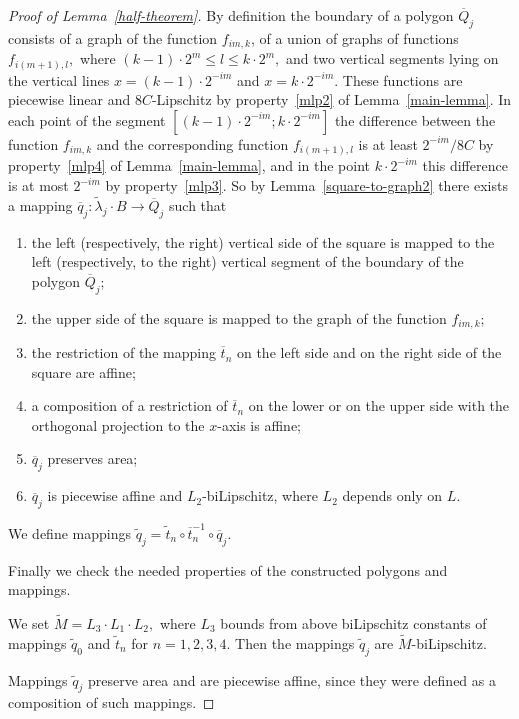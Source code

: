 \documentclass[12pt]{article}
\theoremstyle{definition}
\begin{document}
\begin{proof}[Proof of Lemma~\ref{half-theorem}]
By definition the boundary of a polygon $\overline Q_j$ consists of a graph of the function $f_{im, k}$, of a union of graphs of functions $f_{i(m+1), l},$ where $(k-1)\cdot2^m \le l \le k\cdot2^{m},$ and two vertical segments lying on the vertical lines $x = (k-1)\cdot2^{-im}$ and $x=k\cdot2^{-im}.$ These functions are piecewise linear and $8C$-Lipschitz by property~\ref{mlp2} of Lemma~\ref{main-lemma}. In each point of the segment $[(k-1)\cdot2^{-im}; k\cdot2^{-im}]$ the difference between the function $f_{im, k}$ and the corresponding function $f_{i(m+1), l}$ is at least $2^{-im}/8C$ by property~\ref{mlp4} of Lemma~\ref{main-lemma}, and in the point $k\cdot2^{-im}$ this difference is at most $2^{-im}$ by property~\ref{mlp3}. So by Lemma~\ref{square-to-graph2} there exists a mapping $\overline q_j: \widetilde\lambda_{j}\cdot B \to\overline Q_j$ such that
\begin{enumerate}[label = \arabic*), ref = \arabic*)]
\item the left (respectively, the right) vertical side of the square is mapped to the left (respectively, to the right) vertical segment of the boundary of the polygon $\overline Q_j$;
\item the upper side of the square is mapped to the graph of the function $f_{im, k}$;
\item the restriction of the mapping $\overline t_n$ on the left side and on the right side of the square are affine;
\item a composition of a restriction of $\overline t_n$ on the lower or on the upper side with the orthogonal projection to the $x$-axis is affine;
\item $\overline q_j$ preserves area;
\item $\overline q_j$ is piecewise affine and $L_2$-biLipschitz, where $L_2$ depends only on $L$.
\end{enumerate}

We define mappings $\widetilde q_j = \widetilde t_n\circ\overline t_n^{-1}\circ\overline q_j.$

\smallskip
{} Finally we check the needed properties of the constructed polygons and mappings.

We set $\widetilde M = L_3\cdot L_1\cdot L_2,$ where $L_3$ bounds from above biLipschitz constants of mappings $\widetilde q_0$ and $\widetilde t_n$ for $n=1,2,3,4.$ Then the mappings $\widetilde q_j$ are $\widetilde M$-biLipschitz.

Mappings $\widetilde q_j$ preserve area and are piecewise affine, since they were defined as a composition of such mappings.


\end{proof}
\end{document}
